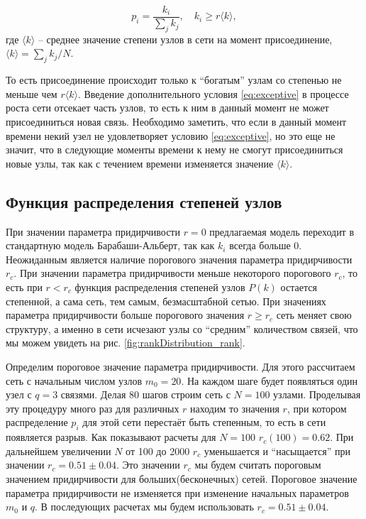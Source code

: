 \documentclass[10pt,aps,pra]{revtex4-1}
\begin{document}
            \begin{equation}\label{eq:exceptive}
                p_i = \frac{k_i}{\sum\limits_{j} k_j},\quad k_i \geq r \langle k \rangle,
            \end{equation}
                где $\langle k \rangle$ – среднее значение степени узлов в сети на момент присоединение, $\langle k \rangle = \sum\limits_{j}{k_j}/{N}$.

        То есть присоединение происходит только к ``богатым'' узлам со степенью не меньше чем $r\langle k \rangle$. Введение дополнительного условия \eqref{eq:exceptive} в процессе роста сети отсекает часть узлов, то есть к ним в данный момент не может присоединиться новая связь. Необходимо заметить, что если в данный момент времени некий узел не удовлетворяет условию \eqref{eq:exceptive}, но это еще не значит, что в следующие моменты времени к нему не смогут присоединиться новые узлы, так как с течением времени изменяется значение $\langle k \rangle$.

    \subsection{Функция распределения степеней узлов}

        При значении параметра придирчивости $r=0$ предлагаемая модель переходит в стандартную модель Барабаши-Альберт, так как $k_i$ всегда больше 0. Неожиданным является наличие порогового значения параметра придирчивости $r_c$. При значении параметра придирчивости меньше некоторого порогового $r_c$, то есть при $r<r_c$ функция распределения степеней узлов $P(k)$ остается степенной, а сама сеть, тем самым, безмасштабной сетью. При значениях параметра придирчивости больше порогового значения $r \geq r_c$ сеть меняет свою структуру, а именно в сети исчезают узлы со ``средним'' количеством связей, что мы можем увидеть на рис. \ref{fig:rankDistribution_rank}. 

        Определим пороговое значение параметра придирчивости. Для этого рассчитаем сеть с начальным числом узлов $m_0 = 20$. На каждом шаге будет появляться один узел с $q=3$ связями. Делая 80 шагов строим сеть с $N=100$ узлами. Проделывая эту процедуру много раз для различных $r$ находим то значения $r$, при котором распределение $p_i$ для этой сети перестаёт быть степенным, то есть в сети появляется разрыв. Как показывают расчеты для $N=100$ $r_c(100) = 0.62$. При дальнейшем увеличении $N$ от 100 до 2000 $r_c$ уменьшается и ``насыщается'' при значении $r_c=0.51 \pm 0.04$. Это значении $r_c$ мы будем считать пороговым значением придирчивости для больших(бесконечных) сетей. Пороговое значение параметра придирчивости не изменяется при изменение начальных параметров $m_0$ и $q$. В последующих расчетах мы будем использовать $r_c=0.51 \pm 0.04$.
\end{document}
